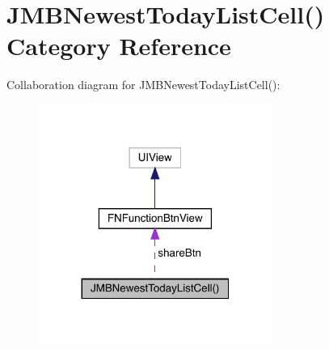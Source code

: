 \hypertarget{category_j_m_b_newest_today_list_cell_07_08}{}\section{J\+M\+B\+Newest\+Today\+List\+Cell() Category Reference}
\label{category_j_m_b_newest_today_list_cell_07_08}


Collaboration diagram for J\+M\+B\+Newest\+Today\+List\+Cell()\+:\nopagebreak
\begin{figure}[H]
\begin{center}
\leavevmode
\includegraphics[width=215pt]{category_j_m_b_newest_today_list_cell_07_08__coll__graph}
\end{center}
\end{figure}
